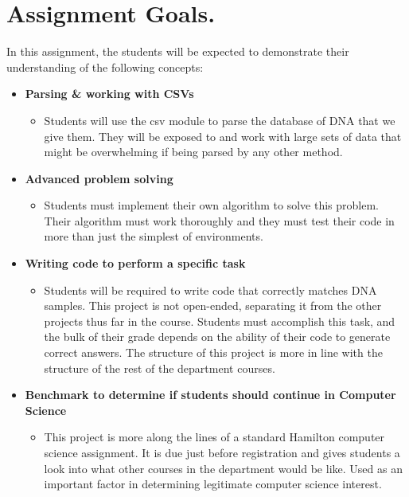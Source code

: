 \documentclass[11pt, letterpaper, onecolumn, oneside, final]{article}
\begin{document}
    \maketitle
\section{Assignment Goals.}
In this assignment, the students will be expected to demonstrate their understanding of the following concepts:
\begin{itemize}
\item \textbf{Parsing \& working with CSVs}
\begin{itemize}
    \item Students will use the {\consolas csv} module to parse the database of DNA that we give them. They will be exposed to and work with large sets of data that might be overwhelming if being parsed by any other method.
\end{itemize}
\item \textbf{Advanced problem solving}
\begin{itemize}
    \item Students must implement their own algorithm to solve this problem. Their algorithm must work thoroughly and they must test their code in more than just the simplest of environments. 
\end{itemize}

\item \textbf{Writing code to perform a specific task}
\begin{itemize}
    \item Students will be required to write code that correctly matches DNA samples. This project is not open-ended, separating it from the other projects thus far in the course. Students must accomplish this task, and the bulk of their grade depends on the ability of their code to generate correct answers. The structure of this project is more in line with the structure of the rest of the department courses.
\end{itemize}

\item \textbf{Benchmark to determine if students should continue in Computer Science}
\begin{itemize}
    \item This project is more along the lines of a standard Hamilton computer science assignment. It is due just before registration and gives students a look into what other courses in the department would be like. Used as an important factor in determining legitimate computer science interest.
\end{itemize}
\end{itemize}
\end{document}
